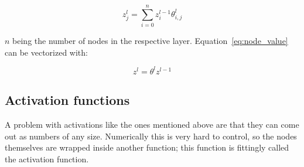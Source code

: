 \begin{equation} \label{eq:node_value}
    z^l_j = \sum^n_{i=0}z^{l-1}_i\theta^l_{i, j}
\end{equation}

$n$ being the number of nodes in the respective layer. Equation~\eqref{eq:node_value} can be vectorized with:

\begin{equation} \label{eq:node_value_vectorized}
    z^l = \theta^l z^{l-1}
\end{equation}

\subsection{Activation functions}

A problem with activations like the ones mentioned above are that they can come out as numbers of any size. Numerically this is very hard to control, so the nodes themselves are wrapped inside another function; this function is fittingly called the activation function.

